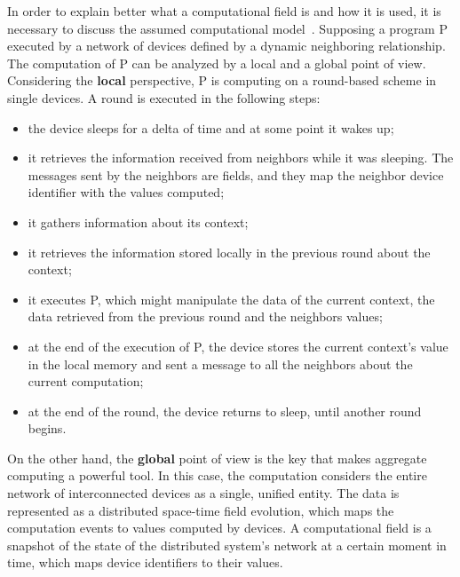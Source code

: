 In order to explain better what a computational field is and how it is used, it is necessary to discuss the assumed computational model~\cite{computational_fields_theory}.\newline
Supposing a program P executed by a network of devices defined by a dynamic neighboring relationship. The computation of P can be analyzed by a local and a global point of view.\newline
Considering the \textbf{local} perspective, P is computing on a round-based scheme in single devices. A round is executed in the following steps:
\begin{itemize}
    \item the device sleeps for a delta of time and at some point it wakes up;
    \item it retrieves the information received from neighbors while it was sleeping. The messages sent by the neighbors are fields, and they map the neighbor device identifier with the values computed;
    \item it gathers information about its context;
    \item it retrieves the information stored locally in the previous round about the context;
    \item it executes P, which might manipulate the data of the current context, the data retrieved from the previous round and the neighbors values;
    \item at the end of the execution of P, the device stores the current context's value in the local memory and sent a message to all the neighbors about the current computation;
    \item at the end of the round, the device returns to sleep, until another round begins.
\end{itemize}

On the other hand, the \textbf{global} point of view is the key that makes aggregate computing a powerful tool. In this case, the computation considers the entire network of interconnected devices as a single, unified entity.\newline
The data is represented as a distributed space-time field evolution, which maps the computation events to values computed by devices.\newline
A computational field is a snapshot of the state of the distributed system's network at a certain moment in time, which maps device identifiers to their values.


